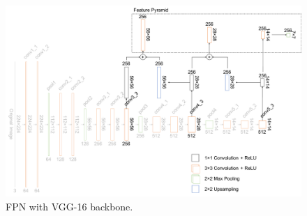 \begin{figure}[!h]
	\centering
	\includegraphics[width=\fig\textwidth]{3-14.pdf}
    \caption[FPN with VGG-16 backbone.]{FPN with VGG-16 backbone.}
    \label{fig:fpnvgg}
\end{figure}
